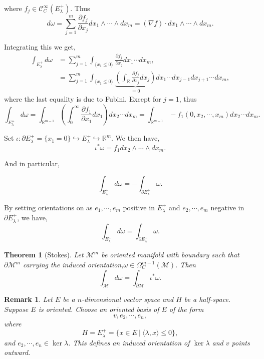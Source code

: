 \documentclass[10pt]{article}
\newtheorem{theorem}{Theorem} [section]
\newtheorem{remark}{Remark}[section]
\newcommand{\R}[0]{\mathbb{R}}
\newcommand{\M}[0]{\mathcal{M}}
\newcommand{\cinf}[0]{\mathcal{C}^\infty}
\newcommand{\sep}[0]{\:|\:}
\newcommand{\pd}[2]{{\frac {\partial #1} {\partial #2}}}
\begin{document}
where $f_j\in\cinf_C(E_\lambda^+)$. Thus 
\begin{equation*}
  d\omega = \sum_{j=1}^m \pd{f_j}{x_j}dx_1\wedge\cdots\wedge dx_m = (\nabla f)\cdot dx_1\wedge\cdots\wedge dx_m.
\end{equation*}

Integrating this we get,
\begin{align*}
  \int_{E_\lambda^+}d\omega & = \sum_{j=1}^m\int_{\{x_1\leq 0\}}\pd{f_j}{x_j}dx_1\cdots dx_m,\\
  & =\sum_{j=1}^m\int_{\{x_1\leq 0\}}\underbrace{\left(\int_\R\pd{f_j}{x_j}dx_j\right)}_{=0}dx_1\cdots dx_{j-1}dx_{j+1}\cdots dx_m,
\end{align*}
where the last equality is due to Fubini. Except for $j=1$, thus 
\begin{equation*}
  \int_{E_\lambda^+}d\omega = \int_{\R^{m-1}}\left(\int_0^\infty\pd{f_1}{x_1}dx_1\right)dx_2\cdots dx_m = \int_{\R^{m-1}}-f_1(0,x_2,\cdots,x_m)dx_2\cdots dx_m.
\end{equation*}

Set $\iota:\partial E_\lambda^+ = \{x_1=0\}\hookrightarrow E_\lambda^+\hookrightarrow\R^m$. We then have,
\begin{equation*}
  \iota^*\omega = f_1dx_2\wedge\cdots\wedge dx_m.
\end{equation*}

And in particular,

\begin{equation*}
  \int_{E_\lambda^+}d\omega = -\int_{\partial E_\lambda^+}\omega.
\end{equation*}

By setting orientations on as $e_1,\cdots,e_m$ positive in $E_\lambda^+$ and $e_2,\cdots,e_m$ negative in $\partial E_\lambda^+$, we have, 
\begin{equation*}
  \int_{E_\lambda^+}d\omega = \int_{\partial E_\lambda^+}\omega.
\end{equation*}

\begin{theorem}[Stokes]
  Let $\M^m$ be oriented manifold with boundary such that $\partial\M^m$ carrying the induced orientation,$ \omega\in\Omega_C^{m-1}(\M)$. Then 
  \begin{equation*}
    \int_{\M}d\omega = \int_{\partial \M}\iota^*\omega.
  \end{equation*}
\end{theorem}

\begin{remark}
  Let $E$ be a $n$-dimensional vector space and $H$ be a half-space. Suppose $E$ is oriented. Choose an oriented basis of $E$ of the form 
  \begin{equation*}
    v,e_2,\cdots,e_n,
  \end{equation*}
  where 
  \begin{equation*}
    H = E_\lambda^+=\{x\in E\sep \langle \lambda,x\rangle\leq0\},
  \end{equation*}
  and $e_2,\cdots,e_n\in\ker \lambda$. This defines an induced orientation of $\ker\lambda$ and $v$ points outward.
\end{remark}
\end{document}
